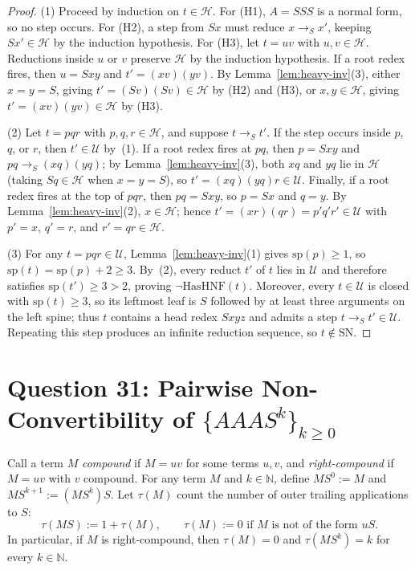 \documentclass[11pt,reqno]{amsart}
\theoremstyle{definition}
\theoremstyle{remark}
\newcommand{\SN}{\mathrm{SN}}
\newcommand{\toS}{\to_S}
\begin{document}
\begin{proof}
(1) Proceed by induction on $t \in \mathcal{H}$. For (H1), $A = S S S$ is a normal form, so no step occurs. For (H2), a step from $S x$ must reduce $x \toS x'$, keeping $S x' \in \mathcal{H}$ by the induction hypothesis. For (H3), let $t = u v$ with $u, v \in \mathcal{H}$. Reductions inside $u$ or $v$ preserve $\mathcal{H}$ by the induction hypothesis. If a root redex fires, then $u = S x y$ and $t' = (x v)(y v)$. By Lemma~\ref{lem:heavy-inv}(3), either $x = y = S$, giving $t' = (S v)(S v) \in \mathcal{H}$ by (H2) and (H3), or $x, y \in \mathcal{H}$, giving $t' = (x v)(y v) \in \mathcal{H}$ by (H3).

(2) Let $t = p q r$ with $p, q, r \in \mathcal{H}$, and suppose $t \toS t'$. If the step occurs inside $p$, $q$, or $r$, then $t' \in \mathcal{U}$ by~(1). If a root redex fires at $p q$, then $p = S x y$ and $p q \toS (x q)(y q)$; by Lemma~\ref{lem:heavy-inv}(3), both $x q$ and $y q$ lie in $\mathcal{H}$ (taking $S q \in \mathcal{H}$ when $x = y = S$), so $t' = (x q)(y q) r \in \mathcal{U}$. Finally, if a root redex fires at the top of $p q r$, then $p q = S x y$, so $p = S x$ and $q = y$. By Lemma~\ref{lem:heavy-inv}(2), $x \in \mathcal{H}$; hence $t' = (x r)(q r) = p' q' r' \in \mathcal{U}$ with $p' = x$, $q' = r$, and $r' = q r \in \mathcal{H}$.

(3) For any $t = p q r \in \mathcal{U}$, Lemma~\ref{lem:heavy-inv}(1) gives $\mathrm{sp}(p) \ge 1$, so $\mathrm{sp}(t) = \mathrm{sp}(p) + 2 \ge 3$. By~(2), every reduct $t'$ of $t$ lies in $\mathcal{U}$ and therefore satisfies $\mathrm{sp}(t') \ge 3 > 2$, proving $\neg \mathrm{HasHNF}(t)$. Moreover, every $t \in \mathcal{U}$ is closed with $\mathrm{sp}(t) \ge 3$, so its leftmost leaf is $S$ followed by at least three arguments on the left spine; thus $t$ contains a head redex $S x y z$ and admits a step $t \toS t' \in \mathcal{U}$. Repeating this step produces an infinite reduction sequence, so $t \notin \SN$.
\end{proof}

\section{Question 31: Pairwise Non-Convertibility of $\{A A A S^k\}_{k \ge 0}$}\label{sec:q31}

Call a term $M$ \emph{compound} if $M = u v$ for some terms $u, v$, and \emph{right-compound} if $M = u v$ with $v$ compound. For any term $M$ and $k \in \mathbb{N}$, define $M S^0 := M$ and $M S^{k+1} := (M S^k) S$. Let $\tau(M)$ count the number of outer trailing applications to $S$:
\[
  \tau(M S) := 1 + \tau(M), \qquad \tau(M) := 0 \text{ if } M \text{ is not of the form } u S.
\]
In particular, if $M$ is right-compound, then $\tau(M) = 0$ and $\tau(M S^k) = k$ for every $k \in \mathbb{N}$.
\end{document}
